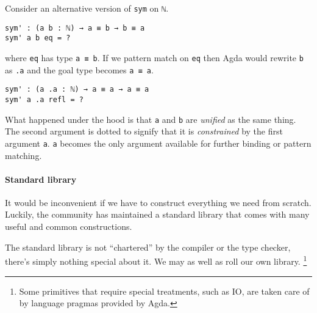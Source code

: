 \documentclass[\main/thesis.tex]{subfiles}
\begin{document}
Consider an alternative version of {\lstinline|sym|} on {\lstinline|ℕ|}.

\begin{lstlisting}
sym' : (a b : ℕ) → a ≡ b → b ≡ a
sym' a b eq = ?
\end{lstlisting}
%
where {\lstinline|eq|} has type {\lstinline|a ≡ b|}.
If we pattern match on {\lstinline|eq|} then Agda would rewrite {\lstinline|b|}
as {\lstinline|.a|} and the goal type becomes {\lstinline|a ≡ a|}.
\begin{lstlisting}
sym' : (a .a : ℕ) → a ≡ a → a ≡ a
sym' a .a refl = ?
\end{lstlisting}

What happened under the hood is that {\lstinline|a|} and {\lstinline|b|} are
\textit{unified} as the same thing. The second argument is dotted to signify that
it is \textit{constrained} by the first argument {\lstinline|a|}. {\lstinline|a|}
becomes the only argument available for further binding or pattern matching.

\paragraph{Standard library}

It would be inconvenient if we have to construct everything we need from scratch.
Luckily, the community has maintained a standard library that comes with many useful
and common constructions.

The standard library is not ``chartered'' by the compiler or the type checker,
there's simply nothing special about it. We may as well as roll our own library.
\footnote{Some primitives that require special treatments, such as IO, are taken
care of by language pragmas provided by Agda.}
\end{document}

